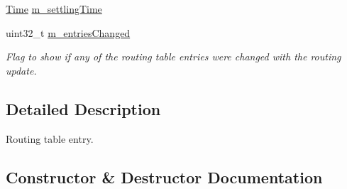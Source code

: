 \begin{DoxyCompactItemize}
\hyperlink{classns3_1_1Time}{Time} \hyperlink{classns3_1_1dsdv_1_1RoutingTableEntry_aaca91e96d777062a28394ccb1a59814e}{m\+\_\+settling\+Time}
\item 
uint32\+\_\+t \hyperlink{classns3_1_1dsdv_1_1RoutingTableEntry_a83c1ffb4985df769e51538317a2e6d01}{m\+\_\+entries\+Changed}
\begin{DoxyCompactList}\small\item\em Flag to show if any of the routing table entries were changed with the routing update. \end{DoxyCompactList}\end{DoxyCompactItemize}


\subsection{Detailed Description}
Routing table entry. 

\subsection{Constructor \& Destructor Documentation}
